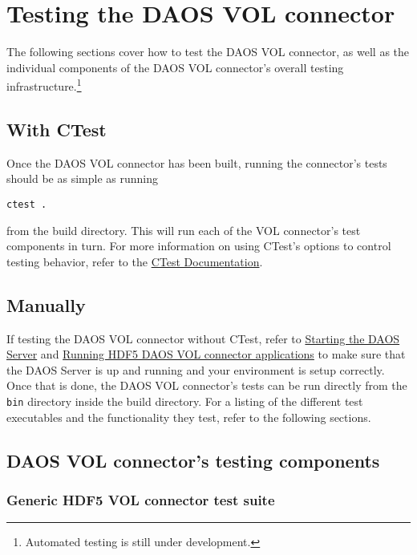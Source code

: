 \section{Testing the DAOS VOL connector}

The following sections cover how to test the DAOS VOL connector, as well as the individual components of the DAOS VOL connector's overall testing infrastructure.\footnote{Automated testing is still under development.}

\subsection{With CTest}

Once the DAOS VOL connector has been built, running the connector's tests should be as simple as running

\begin{verbatim}
ctest .
\end{verbatim}

from the build directory. This will run each of the VOL connector's test components in turn. For more information on using CTest's options to control testing behavior, refer to the \href{https://cmake.org/cmake/help/v3.15/manual/ctest.1.html}{CTest Documentation}.

\subsection{Manually}

If testing the DAOS VOL connector without CTest, refer to \hyperref[sec:daos_serv_start]{Starting the DAOS Server} and \hyperref[running_daos_vol_apps]{Running HDF5 DAOS VOL connector applications} to make sure that the DAOS Server is up and running and your environment is setup correctly. Once that is done, the DAOS VOL connector's tests can be run directly from the \texttt{bin} directory inside the build directory. For a listing of the different test executables and the functionality they test, refer to the following sections.

\newpage

\subsection{DAOS VOL connector's testing components}

\subsubsection{Generic HDF5 VOL connector test suite}

